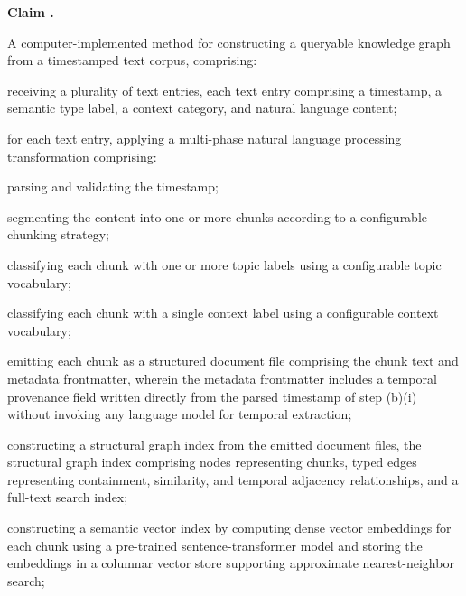 \documentclass[12pt,letterpaper]{article}
\newcounter{claimnum}
\newenvironment{claims}
  {\begin{list}{\textbf{Claim \arabic{claimnum}.}}
      {\usecounter{claimnum}
       \setlength{\labelwidth}{1.8cm}
       \setlength{\labelsep}{0.4cm}
       \setlength{\leftmargin}{2.2cm}
       \setlength{\itemsep}{12pt}
       \setlength{\parsep}{4pt}}}
  {\end{list}}
\begin{document}
\begin{claims}

\item A computer-implemented method for constructing a queryable knowledge graph from a
timestamped text corpus, comprising:

\begin{claimelems}
  \item receiving a plurality of text entries, each text entry comprising a timestamp,
        a semantic type label, a context category, and natural language content;

  \item for each text entry, applying a multi-phase natural language processing
        transformation comprising:
    \begin{claimelems}
      \item parsing and validating the timestamp;
      \item segmenting the content into one or more chunks according to a configurable
            chunking strategy;
      \item classifying each chunk with one or more topic labels using a configurable
            topic vocabulary;
      \item classifying each chunk with a single context label using a configurable
            context vocabulary;
    \end{claimelems}

  \item emitting each chunk as a structured document file comprising the chunk text and
        metadata frontmatter, wherein the metadata frontmatter includes a temporal
        provenance field written directly from the parsed timestamp of step (b)(i)
        without invoking any language model for temporal extraction;

  \item constructing a structural graph index from the emitted document files, the
        structural graph index comprising nodes representing chunks, typed edges
        representing containment, similarity, and temporal adjacency relationships,
        and a full-text search index;

  \item constructing a semantic vector index by computing dense vector embeddings for
        each chunk using a pre-trained sentence-transformer model and storing the
        embeddings in a columnar vector store supporting approximate nearest-neighbor
        search;
\end{claimelems}


\end{claims}
\end{document}
